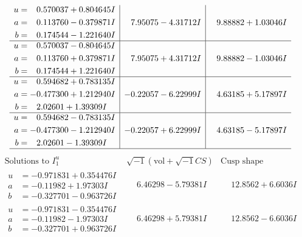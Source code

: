 \documentclass[1p]{elsarticle_modified}
\theoremstyle{definition}
\newcommand{\I}{\sqrt{-1}}
\begin{document}
$$\begin{array}{c|c|c}
\begin{aligned}
u &= \phantom{-}0.570037 + 0.804645 I \\
a &= \phantom{-}0.113760 - 0.379871 I \\
b &= \phantom{-}0.174544 - 1.221640 I\end{aligned}
 & \phantom{-}7.95075 - 4.31712 I & \phantom{-}9.88882 + 1.03046 I \\ \hline\begin{aligned}
u &= \phantom{-}0.570037 - 0.804645 I \\
a &= \phantom{-}0.113760 + 0.379871 I \\
b &= \phantom{-}0.174544 + 1.221640 I\end{aligned}
 & \phantom{-}7.95075 + 4.31712 I & \phantom{-}9.88882 - 1.03046 I \\ \hline\begin{aligned}
u &= \phantom{-}0.594682 + 0.783135 I \\
a &= -0.477300 + 1.212940 I \\
b &= \phantom{-}2.02601 + 1.39309 I\end{aligned}
 & -0.22057 - 6.22999 I & \phantom{-}4.63185 + 5.17897 I \\ \hline\begin{aligned}
u &= \phantom{-}0.594682 - 0.783135 I \\
a &= -0.477300 - 1.212940 I \\
b &= \phantom{-}2.02601 - 1.39309 I\end{aligned}
 & -0.22057 + 6.22999 I & \phantom{-}4.63185 - 5.17897 I\\
 \hline 
 \end{array}$$\newpage$$\begin{array}{c|c|c}  
\text{Solutions to }I^u_{1}& \I (\text{vol} + \sqrt{-1}CS) & \text{Cusp shape}\\
 \hline 
\begin{aligned}
u &= -0.971831 + 0.354476 I \\
a &= -0.11982 + 1.97303 I \\
b &= -0.327701 - 0.963726 I\end{aligned}
 & \phantom{-}6.46298 - 5.79381 I & \phantom{-}12.8562 + 6.6036 I \\ \hline\begin{aligned}
u &= -0.971831 - 0.354476 I \\
a &= -0.11982 - 1.97303 I \\
b &= -0.327701 + 0.963726 I\end{aligned}
 & \phantom{-}6.46298 + 5.79381 I & \phantom{-}12.8562 - 6.6036 I \\ \hline\begin{aligned}

\end{aligned}
\end{array}$$
\end{document}
